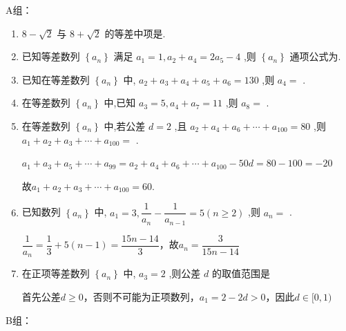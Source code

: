 A组：
\begin{enumerate}
    \item $8 - \sqrt{2}$ 与 $8 + \sqrt{2}$ 的等差中项是.
    \item 已知等差数列 $\left\{  {a}_{n}\right\}$ 满足 ${a}_{1} = 1,{a}_{2} + {a}_{4} = 2{a}_{5} - 4$ ,则 $\left\{  {a}_{n}\right\}$ 通项公式为.
    \item 已知在等差数列 $\left\{  {a}_{n}\right\}$ 中, ${a}_{2} + {a}_{3} + {a}_{4} + {a}_{5} + {a}_{6} = {130}$ ,则 ${a}_{4} =$ .
    \item 在等差数列 $\left\{  {a}_{n}\right\}$ 中,已知 ${a}_{3} = 5,{a}_{4} + {a}_{7} = {11}$ ,则 ${a}_{8} =$ .
    \item 在等差数列 $\left\{  {a}_{n}\right\}$ 中,若公差 $d = 2$ ,且 ${a}_{2} + {a}_{4} + {a}_{6} + \cdots  + {a}_{100} = {80}$ ,则${a}_{1} + {a}_{2} + {a}_{3} + \cdots  + {a}_{100} =$ .
    \begin{jieda}
        ${a}_{1} + {a}_{3} + {a}_{5} + \cdots  + {a}_{99} = {a}_{2} + {a}_{4} + {a}_{6} + \cdots  + {a}_{100} - 50d = 80 - 100 = -20$

        故${a}_{1} + {a}_{2} + {a}_{3} + \cdots  + {a}_{100} = 60$.
    \end{jieda}
    \item 已知数列 $\left\{  {a}_{n}\right\}$ 中, ${a}_{1} = 3,\dfrac{1}{{a}_{n}} - \dfrac{1}{{a}_{n - 1}} = 5\left( {n \geq  2}\right)$ ,则 ${a}_{n} =$ .
    \begin{jieda}
        $\dfrac{1}{a_n} = \dfrac{1}{3} + 5(n-1) = \dfrac{15n-14}{3}$，故$a_n = \dfrac{3}{15n-14}$
    \end{jieda}
    \item 在正项等差数列 $\left\{  {a}_{n}\right\}$ 中, ${a}_{3} = 2$ ,则公差 $d$ 的取值范围是\blkda{$[0, 1)$}
    \begin{jieda}
        首先公差$d \geq 0$，否则不可能为正项数列，$a_1 = 2 - 2d > 0$，因此$d \in [0, 1)$
    \end{jieda}
\end{enumerate}
B组：
